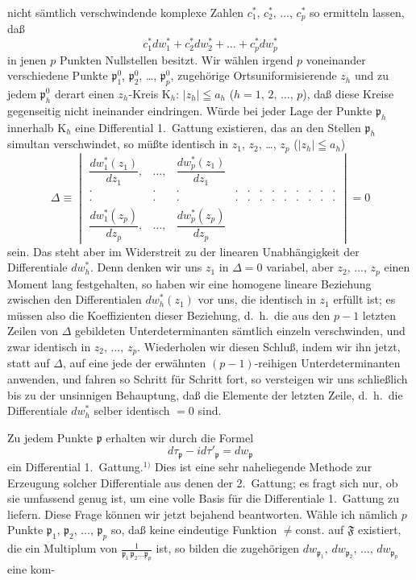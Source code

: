 \documentclass{article}
\begin{document}
nicht sämtlich verschwindende komplexe Zahlen $c_1^*, \, c_2^*, \, \dots, \, c_p^*$ so ermitteln lassen, daß
\[ c_1^* dw_1^* + c_2^* dw_2^* + \dots + c_p^* dw_p^* \]
in jenen $p$ Punkten Nullstellen besitzt. Wir wählen irgend $p$ voneinander verschiedene Punkte $\mathfrak{p}_1^0$, $\mathfrak{p}_2^0$, \dots, $\mathfrak{p}_p^0$, zugehörige Ortsuniformisierende $z_h$ und zu jedem $\mathfrak{p}_h^0$ derart einen $z_h$-Kreis $\mathrm{K}_h$: $|z_h| \leqq a_h$ ($h = 1, \, 2, \, \dots, \, p$), daß diese Kreise gegenseitig nicht ineinander eindringen. Würde bei jeder Lage der Punkte $\mathfrak{p}_h$ innerhalb $\mathrm{K}_h$ eine Differential 1.\ Gattung existieren, das an den Stellen $\mathfrak{p}_h$ simultan verschwindet, so müßte identisch in $z_1$, $z_2$, \dots, $z_p$ ($|z_h| \leqq a_h$)
\[ \Delta \equiv \begin{vmatrix}
\dfrac{dw_1^*(z_1)}{dz_1}, & \dots, & \dfrac{dw_p^*(z_1)}{dz_1} \\
\cdot & \cdot & \cdot & \cdot & \cdot & \cdot & \cdot & \cdot & \cdot & \cdot & \cdot & \cdot \\
\cdot & \cdot & \cdot & \cdot & \cdot & \cdot & \cdot & \cdot & \cdot & \cdot & \cdot & \cdot \\
\dfrac{dw_1^*(z_p)}{dz_p}, & \dots, & \dfrac{dw_p^*(z_p)}{dz_p}
\end{vmatrix} = 0 \]
sein. Das steht aber im Widerstreit zu der linearen Unabhängigkeit der Differentiale $dw_h^*$. Denn denken wir uns $z_1$ in $\Delta = 0$ variabel, aber $z_2, \, \dots, \, z_p$ einen Moment lang festgehalten, so haben wir eine homogene lineare Beziehung zwischen den Differentialen $dw_h^*(z_1)$ vor uns, die identisch in $z_1$ erfüllt ist; es müssen also die Koeffizienten dieser Beziehung, d.~h.\ die aus den $p - 1$ letzten Zeilen von $\Delta$ gebildeten Unterdeterminanten sämtlich einzeln verschwinden, und zwar identisch in $z_2, \, \dots, \, z_p$. Wiederholen wir diesen Schluß, indem wir ihn jetzt, statt auf $\Delta$, auf eine jede der erwähnten $(p - 1)$-reihigen Unterdeterminanten anwenden, und fahren so Schritt für Schritt fort, so versteigen wir uns schließlich bis zu der unsinnigen Behauptung, daß die Elemente der letzten Zeile, d.~h.\ die Differentiale $dw_h^*$ selber identisch $= 0$ sind.

Zu jedem Punkte $\mathfrak{p}$ erhalten wir durch die Formel
\[ d\tau_{\mathfrak{p}} - i d\tau'_{\mathfrak{p}} = dw_{\mathfrak{p}} \]
ein Differential 1.\ Gattung.${}^{1)}$ Dies ist eine sehr naheliegende Methode zur Erzeugung solcher Differentiale aus denen der 2.\ Gattung; es fragt sich nur, ob sie umfassend genug ist, um eine volle Basis für die Differentiale 1.\ Gattung zu liefern. Diese Frage können wir jetzt bejahend beantworten. Wähle ich nämlich $p$ Punkte $\mathfrak{p}_1, \, \mathfrak{p}_2, \, \dots, \, \mathfrak{p}_p$ so, daß keine eindeutige Funktion $\neq \mathrm{const.}$ auf $\mathfrak{F}$ existiert, die ein Multiplum von $\frac{1}{\mathfrak{p}_1 \, \mathfrak{p}_2 \dots \mathfrak{p}_p}$ ist, so bilden die zugehörigen $dw_{\mathfrak{p}_1}, \, dw_{\mathfrak{p}_2}, \, \dots, \, dw_{\mathfrak{p}_p}$ eine kom-
\end{document}
